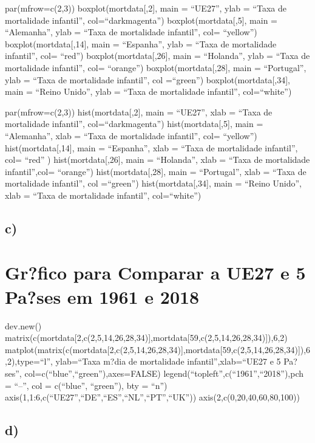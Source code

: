 \documentclass[
]{article}
\begin{document}
par(mfrow=c(2,3)) boxplot(mortdata{[},2{]}, main = ``UE27'', ylab =
``Taxa de mortalidade infantil'', col=``darkmagenta'')
boxplot(mortdata{[},5{]}, main = ``Alemanha'', ylab = ``Taxa de
mortalidade infantil'', col= ``yellow'') boxplot(mortdata{[},14{]}, main
= ``Espanha'', ylab = ``Taxa de mortalidade infantil'', col= ``red'')
boxplot(mortdata{[},26{]}, main = ``Holanda'', ylab = ``Taxa de
mortalidade infantil'', col= ``orange'') boxplot(mortdata{[},28{]}, main
= ``Portugal'', ylab = ``Taxa de mortalidade infantil'', col =``green'')
boxplot(mortdata{[},34{]}, main = ``Reino Unido'', ylab = ``Taxa de
mortalidade infantil'', col=``white'')

par(mfrow=c(2,3)) hist(mortdata{[},2{]}, main = ``UE27'', xlab = ``Taxa
de mortalidade infantil'', col=``darkmagenta'') hist(mortdata{[},5{]},
main = ``Alemanha'', xlab = ``Taxa de mortalidade infantil'', col=
``yellow'') hist(mortdata{[},14{]}, main = ``Espanha'', xlab = ``Taxa de
mortalidade infantil'', col= ``red'' ) hist(mortdata{[},26{]}, main =
``Holanda'', xlab = ``Taxa de mortalidade infantil'',col= ``orange'')
hist(mortdata{[},28{]}, main = ``Portugal'', xlab = ``Taxa de
mortalidade infantil'', col =``green'') hist(mortdata{[},34{]}, main =
``Reino Unido'', xlab = ``Taxa de mortalidade infantil'', col=``white'')

\hypertarget{c-2}{%
\subsection{c)}\label{c-2}}

\hypertarget{grfico-para-comparar-a-ue27-e-5-pases-em-1961-e-2018}{%
\section{Gr?fico para Comparar a UE27 e 5 Pa?ses em 1961 e
2018}\label{grfico-para-comparar-a-ue27-e-5-pases-em-1961-e-2018}}

dev.new()
matrix(c(mortdata{[}2,c(2,5,14,26,28,34){]},mortdata{[}59,c(2,5,14,26,28,34){]}),6,2)
matplot(matrix(c(mortdata{[}2,c(2,5,14,26,28,34){]},mortdata{[}59,c(2,5,14,26,28,34){]}),6,2),type=``l'',
ylab=``Taxa m?dia de mortalidade infantil'',xlab=``UE27 e 5 Pa?ses'',
col=c(``blue'',``green''),axes=FALSE)
legend(``topleft'',c(``1961'',``2018''),pch = ``--'', col = c(``blue'',
``green''), bty = ``n'')
axis(1,1:6,c(``UE27'',``DE'',``ES'',``NL'',``PT'',``UK''))
axis(2,c(0,20,40,60,80,100))

\hypertarget{d-1}{%
\subsection{d)}\label{d-1}}
\end{document}
